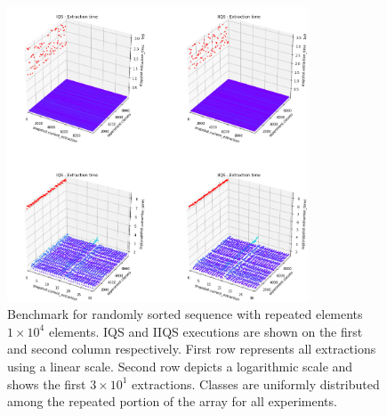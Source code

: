 \begin{figure}[!ht]
    \centering
    \includegraphics[width=0.8\textwidth]{./fragments/04_experimental_execution/images/01_basebenchmark_05_classes.png}
    \caption{Benchmark for randomly sorted sequence with repeated elements $1\times10^4$ elements. IQS and IIQS executions are shown on the first and second column respectively. First row represents all extractions using a linear scale. Second row depicts a logarithmic scale and shows the first $3\times10^1$ extractions. Classes are uniformly distributed among the repeated portion of the array for all experiments.}
    \label{FIG:BENCHMARK_05_CLASSES}
\end{figure}



